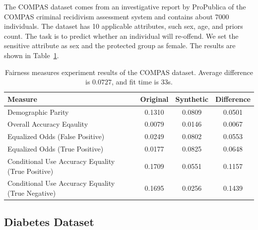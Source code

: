 \documentclass[manuscript,screen,review,anonymous]{acmart}
\begin{document}
The COMPAS\cite{larson2016propublica,Kaggle_COMPAS_Dataset} dataset comes from an investigative report by ProPublica of the COMPAS criminal recidivism assessment system and contains about 7000 individuals. The dataset has 10 applicable attributes, such sex, age, and priors count. The task is to predict whether an individual will re-offend. We set the sensitive attribute as sex and the protected group as female. The results are shown in Table~\ref{tab:compas_score}.



\begin{table}[h]
\caption{
    Fairness measures experiment results of the COMPAS dataset.
    Average difference is $0.0727$, and fit time is 33s.
}
\label{tab:compas_score}
\begin{tabular}{lccc}
\toprule
\textbf{Measure} & \textbf{Original} & \textbf{Synthetic} & \textbf{Difference} \\
\midrule
Demographic Parity  & 0.1310 & 0.0809 & 0.0501 \\
Overall Accuracy Eqaulity   & 0.0079 & 0.0146 & 0.0067 \\
Equalized Odds (False Positive)    & 0.0249 & 0.0802 & 0.0553 \\
Equalized Odds (True Positive)    & 0.0177 & 0.0825 & 0.0648 \\
Conditional Use Accuracy Equality (True Positive) & 0.1709 & 0.0551 & 0.1157 \\
Conditional Use Accuracy Equality (True Negative) & 0.1695 & 0.0256 & 0.1439 \\
\bottomrule
\end{tabular}
\end{table}

\subsection{Diabetes Dataset}
\end{document}
